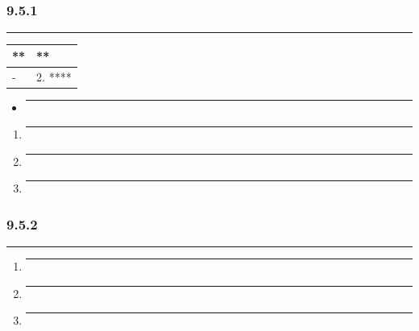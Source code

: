 \subsubsection{9.5.1}\label{section-19}

\begin{center}\rule{0.5\linewidth}{0.5pt}\end{center}

\begin{longtable}[]{@{}ll@{}}
\toprule\noalign{}
** & ** \\
\midrule\noalign{}
\endhead
\bottomrule\noalign{}
\endlastfoot
- & 2. **** \\
\end{longtable}

\begin{itemize}
\item
  \begin{center}\rule{0.5\linewidth}{0.5pt}\end{center}
\end{itemize}

\begin{enumerate}
\def\labelenumi{\arabic{enumi}.}
\item
  \begin{center}\rule{0.5\linewidth}{0.5pt}\end{center}
\item
  \begin{center}\rule{0.5\linewidth}{0.5pt}\end{center}
\item
  \begin{center}\rule{0.5\linewidth}{0.5pt}\end{center}
\end{enumerate}

\subsubsection{9.5.2}\label{section-20}

\begin{center}\rule{0.5\linewidth}{0.5pt}\end{center}

\begin{enumerate}
\def\labelenumi{\arabic{enumi}.}
\item
  \begin{center}\rule{0.5\linewidth}{0.5pt}\end{center}
\item
  \begin{center}\rule{0.5\linewidth}{0.5pt}\end{center}
\item
  \begin{center}\rule{0.5\linewidth}{0.5pt}\end{center}
\end{enumerate}

